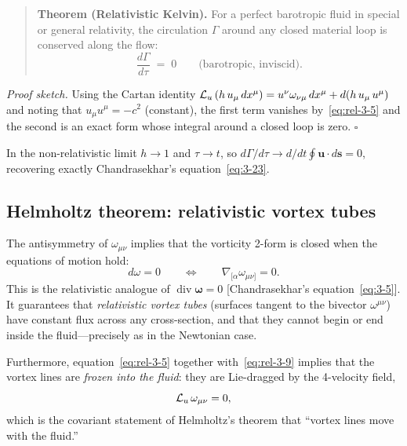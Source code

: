 \begin{quote}
\textbf{Theorem (Relativistic Kelvin).}
For a perfect barotropic fluid in special or general relativity,
the circulation $\Gamma$ around any closed material loop is conserved
along the flow:
\begin{equation}\label{eq:rel-3-8}
  \boxed{\;
  \frac{d\Gamma}{d\tau} \;=\; 0
  \qquad\text{(barotropic, inviscid).}
  \;}
\end{equation}
\end{quote}

\noindent\emph{Proof sketch.}
Using the Cartan identity
$\mathcal{L}_{u}\,(h\,u_{\mu}\,dx^{\mu})
= u^{\nu}\omega_{\nu\mu}\,dx^{\mu} + d(h\,u_{\mu}\,u^{\mu})$
and noting that $u_{\mu}u^{\mu} = -c^{2}$ (constant), the first term
vanishes by~\eqref{eq:rel-3-5} and the second is an exact form whose
integral around a closed loop is zero.  \hfill$\square$

\begin{relcorrection}
In the non-relativistic limit $h\to 1$ and $\tau\to t$, so
$d\Gamma/d\tau \to d/dt\oint \mathbf{u}\cdot d\mathbf{s} = 0$,
recovering exactly Chandrasekhar's equation~\eqref{eq:3-23}.
\end{relcorrection}

\subsection{Helmholtz theorem: relativistic vortex tubes}

The antisymmetry of $\omega_{\mu\nu}$ implies that the vorticity
2-form is closed when the equations of motion hold:
\begin{equation}\label{eq:rel-3-9}
  d\omega = 0
  \qquad\Longleftrightarrow\qquad
  \nabla_{[\alpha}\omega_{\mu\nu]} = 0.
\end{equation}
This is the relativistic analogue of $\operatorname{div}\boldsymbol{\omega}=0$
[Chandrasekhar's equation~\eqref{eq:3-5}].  It guarantees that
\emph{relativistic vortex tubes} (surfaces tangent to the bivector
$\omega^{\mu\nu}$) have constant flux across any cross-section, and
that they cannot begin or end inside the fluid---precisely as in the
Newtonian case.

Furthermore, equation~\eqref{eq:rel-3-5} together with~\eqref{eq:rel-3-9}
implies that the vortex lines are \emph{frozen into the fluid}: they
are Lie-dragged by the 4-velocity field,
\begin{equation}\label{eq:rel-3-10}
  \mathcal{L}_{u}\,\omega_{\mu\nu} = 0,
\end{equation}
which is the covariant statement of Helmholtz's theorem that ``vortex
lines move with the fluid.''



